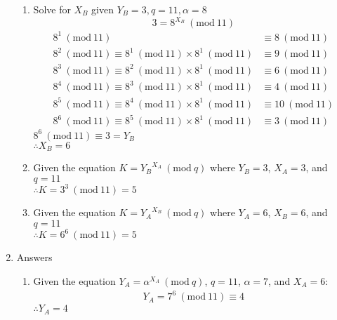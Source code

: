 \documentclass{article}
\newcommand{\Mod}[1]{\ (\mathrm{mod}\ #1)}
\begin{document}
\begin{enumerate}
\begin{enumerate}
        \item Solve for $X_B$ given $Y_B = 3, q = 11, \alpha = 8$ \[3 = 8^{X_B} \Mod{11}\] 
        \begin{align*}
            8^1 \Mod{11} &\equiv 8 \Mod{11}\\
            8^2 \Mod{11} \equiv 8^1 \Mod{11} \times 8^1 \Mod{11} &\equiv 9 \Mod{11} \\
            8^3 \Mod{11} \equiv 8^2 \Mod{11} \times 8^1 \Mod{11} &\equiv 6 \Mod{11} \\
            8^4 \Mod{11} \equiv 8^3 \Mod{11} \times 8^1 \Mod{11} &\equiv 4 \Mod{11} \\
            8^5 \Mod{11} \equiv 8^4 \Mod{11} \times 8^1 \Mod{11} &\equiv 10 \Mod{11} \\
            8^6 \Mod{11} \equiv 8^5 \Mod{11} \times 8^1 \Mod{11} &\equiv 3 \Mod{11} 
        \end{align*}
        $8^6 \Mod{11} \equiv 3 = Y_B$ \\
        $\therefore X_B = 6$

        \item Given the equation $K = {Y_B}^{X_A} \Mod{q}$ where $Y_B = 3$, $X_A = 3$, and $q = 11$ \\
        $\therefore K = 3^3 \Mod{11} = 5$

        \item Given the equation $K = {Y_A}^{X_B} \Mod{q}$ where $Y_A = 6$, $X_B = 6$, and $q = 11$ \\
        $\therefore K = 6^6 \Mod{11} = 5$
        
    \end{enumerate}

    \item Answers
    \begin{enumerate}
        \item Given the equation $Y_A = \alpha^{X_A} \Mod{q}$, $q = 11$, $\alpha = 7$, and $X_A = 6$:
        \begin{align*}
            Y_A = 7^6 \Mod{11} \equiv 4
        \end{align*}
        $\therefore Y_A = 4$ 


\end{enumerate}
\end{enumerate}
\end{document}
